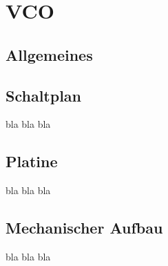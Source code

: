 \chapter{VCO}
\label{ch:concept}
\section{Allgemeines}


\section{Schaltplan}
bla bla bla

\section{Platine}
bla bla bla

\section{Mechanischer Aufbau}
bla bla bla